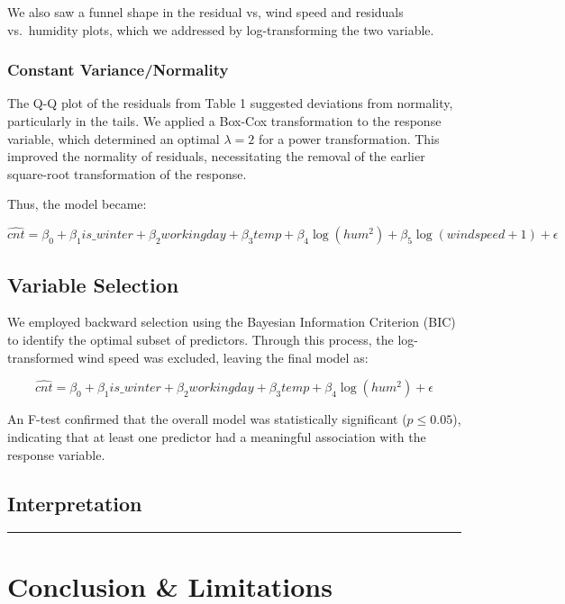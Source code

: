 \documentclass[
  10pt,
]{article}
\begin{document}
We also saw a funnel shape in the residual vs, wind speed and residuals
vs.~humidity plots, which we addressed by log-transforming the two
variable.

\subsubsection{Constant
Variance/Normality}\label{constant-variancenormality}

The Q-Q plot of the residuals from Table 1 suggested deviations from
normality, particularly in the tails. We applied a Box-Cox
transformation to the response variable, which determined an optimal
\(\lambda = 2\) for a power transformation. This improved the normality
of residuals, necessitating the removal of the earlier square-root
transformation of the response.

Thus, the model became:

\[
\hat{cnt} = \beta_0 + \beta_1 is\_winter + \beta_2 workingday + \beta_3 temp + \beta_4 \log(hum^2) + \beta_5 \log(windspeed + 1) + \epsilon
\]

\subsection{Variable Selection}\label{variable-selection}

We employed backward selection using the Bayesian Information Criterion
(BIC) to identify the optimal subset of predictors. Through this
process, the log-transformed wind speed was excluded, leaving the final
model as:

\[
\hat{cnt} = \beta_0 + \beta_1 is\_winter + \beta_2 workingday + \beta_3 temp + \beta_4 \log(hum^2) + \epsilon
\]

An F-test confirmed that the overall model was statistically significant
(\(p\le0.05\)), indicating that at least one predictor had a meaningful
association with the response variable.

\subsection{Interpretation}\label{interpretation}

\begin{center}\rule{0.5\linewidth}{0.5pt}\end{center}

\section{Conclusion \& Limitations}\label{conclusion-limitations}
\end{document}
